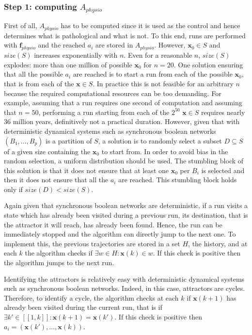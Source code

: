 \documentclass[oneside,a4paper,onecolumn,notitlepage]{article}
\begin{document}
\subsubsection*{Step 1: computing $A_{physio}$}
First of all, $A_{physio}$ has to be computed since it is used as the control and hence determines what is pathological and what is not. To this end, runs are performed with $\boldsymbol{f}_{physio}$ and the reached $a_i$ are stored in $A_{physio}$. However, $\boldsymbol{x}_0\in S$ and $size(S)$ increases exponentially with $n$. Even for a reasonable $n$, $size(S)$ explodes: more than one million of possible $\boldsymbol{x}_0$ for $n=20$. One solution ensuring that all the possible $a_i$ are reached is to start a run from each of the possible $\boldsymbol{x}_0$, that is from each of the $\boldsymbol{x}\in S$. In practice this is not feasible for an arbitrary $n$ because the required computational resources can be too demanding. For example, assuming that a run requires one second of computation and assuming that $n=50$, performing a run starting from each of the $2^{50}$ $\boldsymbol{x}\in S$ requires nearly 36 million years, definitively not a practical duration. However, given that with deterministic dynamical systems such as synchronous boolean networks $(B_1,\dots,B_p)$ is a partition of $S$, a solution is to randomly select a subset $D\subseteq S$ of a given size containing the $\boldsymbol{x}_0$ to start from. In order to avoid bias in the random selection, a uniform distribution should be used. The stumbling block of this solution is that it does not ensure that at least one $\boldsymbol{x}_0$ per $B_i$ is selected and then it does not ensure that all the $a_i$ are reached. This stumbling block holds only if $size(D)<size(S)$.

Again given that synchronous boolean networks are deterministic, if a run visits a state which has already been visited during a previous run, its destination, that is the attractor it will reach, has already been found. Hence, the run can be immediately stopped and the algorithm can directly jump to the next one. To implement this, the previous trajectories are stored in a set $H$, the history, and at each $k$ the algorithm checks if $\exists w\in H: \boldsymbol{x}(k)\in w$. If this check is positive then the algorithm jumps to the next run.

Identifying the attractors is relatively easy with deterministic dynamical systems such as synchronous boolean networks. Indeed, in this case, attractors are cycles. Therefore, to identify a cycle, the algorithm checks at each $k$ if $\boldsymbol{x}(k+1)$ has already been visited during the current run, that is if $\exists k'\in [\![1,k]\!]: \boldsymbol{x}(k+1)=\boldsymbol{x}(k')$. If this check is positive then $a_i=(\boldsymbol{x}(k'),\dots ,\boldsymbol{x}(k))$.
\end{document}

